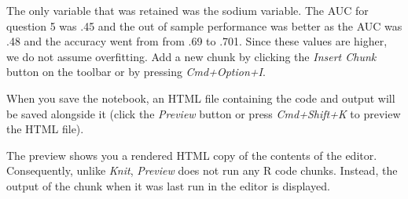 \documentclass[]{article}
\begin{document}
The only variable that was retained was the sodium variable. The AUC for
question 5 was .45 and the out of sample performance was better as the
AUC was .48 and the accuracy went from from .69 to .701. Since these
values are higher, we do not assume overfitting. Add a new chunk by
clicking the \emph{Insert Chunk} button on the toolbar or by pressing
\emph{Cmd+Option+I}.

When you save the notebook, an HTML file containing the code and output
will be saved alongside it (click the \emph{Preview} button or press
\emph{Cmd+Shift+K} to preview the HTML file).

The preview shows you a rendered HTML copy of the contents of the
editor. Consequently, unlike \emph{Knit}, \emph{Preview} does not run
any R code chunks. Instead, the output of the chunk when it was last run
in the editor is displayed.
\end{document}
